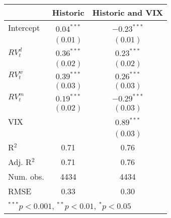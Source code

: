 
\begin{tabular}{l c c }
\hline
 & Historic & Historic and VIX \\
\hline
Intercept    & $0.04^{***}$ & $-0.23^{***}$ \\
             & $(0.01)$     & $(0.01)$      \\
$RV_{t}^{d}$ & $0.36^{***}$ & $0.23^{***}$  \\
             & $(0.02)$     & $(0.02)$      \\
$RV_{t}^{w}$ & $0.39^{***}$ & $0.26^{***}$  \\
             & $(0.03)$     & $(0.03)$      \\
$RV_{t}^{m}$ & $0.19^{***}$ & $-0.29^{***}$ \\
             & $(0.02)$     & $(0.03)$      \\
VIX          &              & $0.89^{***}$  \\
             &              & $(0.03)$      \\
\hline
R$^2$        & 0.71         & 0.76          \\
Adj. R$^2$   & 0.71         & 0.76          \\
Num. obs.    & 4434         & 4434          \\
RMSE         & 0.33         & 0.30          \\
\hline
\multicolumn{3}{l}{\scriptsize{$^{***}p<0.001$, $^{**}p<0.01$, $^*p<0.05$}}
\end{tabular}
